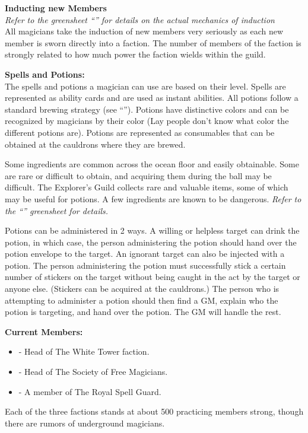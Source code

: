 \documentclass[blue]{NeptuneBall}
\begin{document}
{\bf Inducting new Members}\\
\emph{Refer to the greensheet ``\gInduction{}'' for details on the actual mechanics of induction} \\
All magicians take the induction of new members very seriously as each new member is sworn directly into a faction. The number of members of the faction is strongly related to how much power the faction wields within the guild.

{\bf Spells and Potions:}\\
The spells and potions a magician can use are based on their level. Spells are represented as ability cards and are used as instant abilities. All potions follow a standard brewing strategy (see ``\gPotions{}''). Potions have distinctive colors and can be recognized by magicians by their color (Lay people don't know what color the different potions are). Potions are represented as consumables that can be obtained at the cauldrons where they are brewed.

Some ingredients are common across the ocean floor and easily obtainable. Some are rare or difficult to obtain, and acquiring them during the ball may be difficult. The Explorer's Guild collects rare and valuable items, some of which may be useful for potions. A few ingredients are known to be dangerous. \emph {Refer to the ``\gPotions{}'' greensheet for details.}

Potions can be administered in 2 ways. A willing or helpless target can drink the potion, in which case, the person administering the potion should hand over the potion envelope to the target. An ignorant target can also be injected with a potion. The person administering the potion must successfully stick a certain number of stickers on the target without being caught in the act by the target or anyone else. (Stickers can be acquired at the cauldrons.) The person who is attempting to administer a potion should then find a GM, explain who the potion is targeting, and hand over the potion. The GM will handle the rest.

{\bf Current Members:}
\begin{itemize}
\item \cManta{} - Head of The White Tower faction.
\item \cWitch{\MYname} - Head of The Society of Free Magicians.
\item \cBodyguard{} - A member of The Royal Spell Guard.
\end{itemize}

\begin{itemz}[Trivia]
	\item Each of the three factions stands at about 500 practicing members strong, though there are rumors of underground magicians.
\end{itemz}
\end{document}
